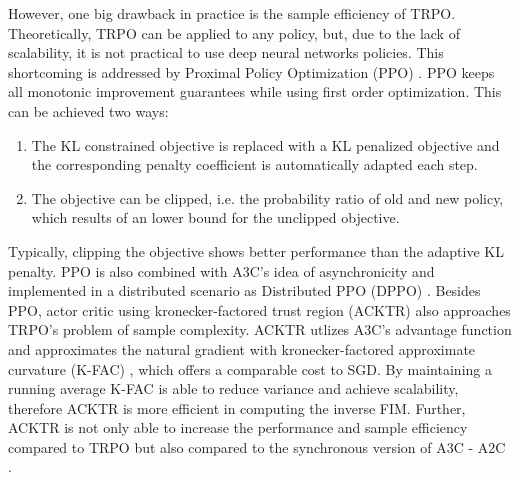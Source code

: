     However, one big drawback in practice is the sample efficiency of TRPO. 
    Theoretically, TRPO can be applied to any policy, but, due to the lack of scalability, it is not practical to use deep neural networks policies.
    This shortcoming is addressed by Proximal Policy Optimization (PPO) \cite{Schulman2017}.
    PPO keeps all monotonic improvement guarantees while using first order optimization. 
    This can be achieved two ways: 
    \begin{enumerate}
    	\item The KL constrained objective is replaced with a KL penalized objective and the corresponding penalty coefficient is automatically adapted each step. 
    	\item The objective can be clipped, i.e. the probability ratio of old and new policy, which results of an lower bound for the unclipped objective. 
    \end{enumerate}
    Typically, clipping the objective shows better performance than the adaptive KL penalty.
    PPO is also combined with A3C's idea of asynchronicity and implemented in a distributed scenario as Distributed PPO (DPPO) \cite{Heess2017}. 
    Besides PPO, actor critic using kronecker-factored trust region (ACKTR)\cite{Wu2017} also approaches TRPO's problem of sample complexity.
    ACKTR utlizes A3C's advantage function and approximates the natural gradient with kronecker-factored approximate curvature (K-FAC) \cite{Grosse2016} \cite{Martens2015}, which offers a comparable cost to SGD. 
    By maintaining a running average K-FAC is able to reduce variance and achieve scalability, therefore ACKTR is more efficient in computing the inverse FIM. 
    Further, ACKTR is not only able to increase the performance and sample efficiency compared to TRPO but also compared to the synchronous version of A3C - A2C \cite{Mnih2016}. 
	
